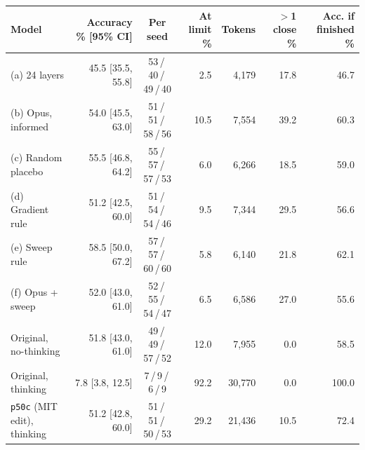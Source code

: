 \begin{tabular}{lrcrrrr}
\toprule
\textbf{Model} & \textbf{Accuracy \% [95\% CI]} & \textbf{Per seed} & \textbf{At limit \%} & \textbf{Tokens} & \textbf{$>$1 close \%} & \textbf{Acc. if finished \%} \\
\midrule
(a) 24 layers & 45.5 [35.5, 55.8] & 53\,/\,40\,/\,49\,/\,40 & 2.5 & 4{,}179 & 17.8 & 46.7 \\
(b) Opus, informed & 54.0 [45.5, 63.0] & 51\,/\,51\,/\,58\,/\,56 & 10.5 & 7{,}554 & 39.2 & 60.3 \\
(c) Random placebo & 55.5 [46.8, 64.2] & 55\,/\,57\,/\,57\,/\,53 & 6.0 & 6{,}266 & 18.5 & 59.0 \\
(d) Gradient rule & 51.2 [42.5, 60.0] & 51\,/\,54\,/\,54\,/\,46 & 9.5 & 7{,}344 & 29.5 & 56.6 \\
(e) Sweep rule & 58.5 [50.0, 67.2] & 57\,/\,57\,/\,60\,/\,60 & 5.8 & 6{,}140 & 21.8 & 62.1 \\
(f) Opus + sweep & 52.0 [43.0, 61.0] & 52\,/\,55\,/\,54\,/\,47 & 6.5 & 6{,}586 & 27.0 & 55.6 \\
\midrule
Original, no-thinking & 51.8 [43.0, 61.0] & 49\,/\,49\,/\,57\,/\,52 & 12.0 & 7{,}955 & 0.0 & 58.5 \\
Original, thinking & 7.8 [3.8, 12.5] & 7\,/\,9\,/\,6\,/\,9 & 92.2 & 30{,}770 & 0.0 & 100.0 \\
\texttt{p50c} (MIT edit), thinking & 51.2 [42.8, 60.0] & 51\,/\,51\,/\,50\,/\,53 & 29.2 & 21{,}436 & 10.5 & 72.4 \\
\bottomrule
\end{tabular}
